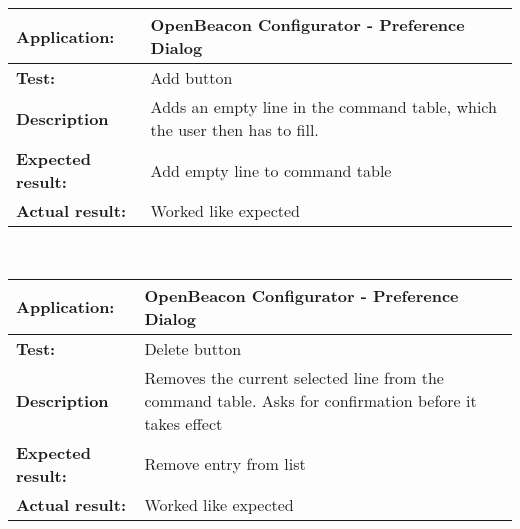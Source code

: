    \begin{tabular}{|p{3.5cm}|p{10.5cm}|}
    \hline
     \textbf{Application:}	& OpenBeacon Configurator - Preference Dialog\\
    \hline
     \textbf{Test:}		& Add button\\
    \hline
     \textbf{Description}	& Adds an empty line in the command table, which the user then has to fill.\\
    \hline
     \textbf{Expected result:}	& Add empty line to command table\\
    \hline
     \textbf{Actual result:}	& Worked like expected\\
    \hline
   \end{tabular}\\
   \begin{tabular}{|p{3.5cm}|p{10.5cm}|}
    \hline
     \textbf{Application:}	& OpenBeacon Configurator - Preference Dialog\\
    \hline
     \textbf{Test:}		& Delete button\\
    \hline
     \textbf{Description}	& Removes the current selected line from the command table. Asks for confirmation before it takes effect\\
    \hline
     \textbf{Expected result:}	& Remove entry from list\\
    \hline
     \textbf{Actual result:}	& Worked like expected\\
    \hline
   \end{tabular}\\

